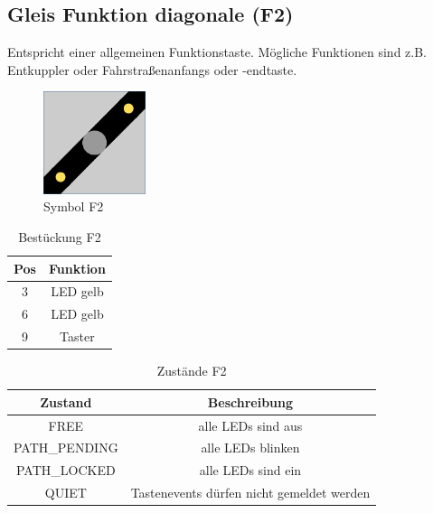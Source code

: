 \documentclass[10pt,a4paper]{article}
\begin{document}
\subsection{Gleis Funktion diagonale (F2)}
Entspricht einer allgemeinen Funktionstaste. Mögliche Funktionen sind z.B. Entkuppler oder Fahrstraßenanfangs oder -endtaste.
\begin{figure}[hbtp]
\centering
\includegraphics[width=3cm]{../folien/f2.png}
\caption{Symbol F2}
\end{figure}
\begin{table}[h!]
\centering
\begin{tabular}{c|c}
\textbf{Pos} & \textbf{Funktion} \\ \hline
3 & LED gelb \\
6 & LED gelb \\
9 & Taster
\end{tabular}
\caption{Bestückung F2}
\end{table}
\begin{table}[h!]
\centering
\begin{tabular}{c|c}
\textbf{Zustand} & \textbf{Beschreibung} \\ \hline
FREE & alle LEDs sind aus \\
PATH\_PENDING & alle LEDs blinken \\
PATH\_LOCKED & alle LEDs sind ein \\
QUIET & Tastenevents dürfen nicht gemeldet werden
\end{tabular}
\caption{Zustände F2}
\end{table}

\newpage
\end{document}
